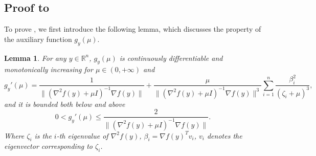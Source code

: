 \documentclass{article}
\newtheorem{lemma}[theorem]{Lemma}
\numberwithin{equation}{section}
\numberwithin{equation}{section}
\begin{document}
\subsection*{Proof to }
To prove , we first introduce the following lemma, which discusses the property of the auxiliary function $g_y(\mu)$.
\begin{lemma}
    \label{lem.property g}
    For any $y\in \mathbb{R}^n$, $g_y(\mu)$ is continuously differentiable and monotonically increasing for $\mu \in \left(0,+\infty\right)$ and
    \begin{equation}
        \label{eq.derivative}
        g_y'(\mu) = \frac{1}{\|\left (\nabla ^2 f(y)+\mu I \right)^{-1}\nabla f(y)\|}+\frac{\mu}{\| (\nabla ^2 f(y)+\mu I )^{-1}\nabla f(y)\|^3}\sum_{i=1}^n\frac{\beta_i^2}{ (\zeta_i+\mu )^3},
    \end{equation}
    and it is bounded both below and above
    \begin{equation}
        \label{eq.derivative bound}
        0< g_y'(\mu) \leq \frac{2}{\| (\nabla ^2 f(y)+\mu I )^{-1}\nabla f(y)\|}.
    \end{equation}
    Where $\zeta_i$ is the $i$-th eigenvalue of $\nabla ^2 f(y)$, $\beta_i = \nabla f(y)^T v_i$, $v_i$ denotes the eigenvector corresponding to $\zeta_i$.
\end{lemma}
\end{document}
